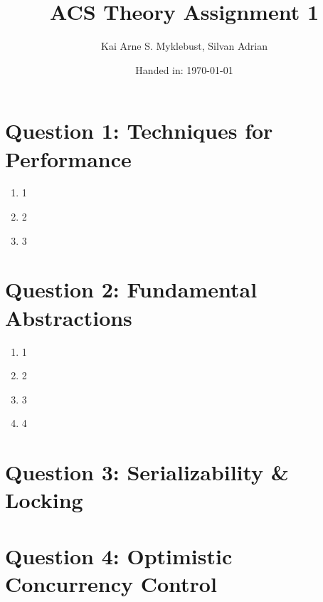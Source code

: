 \documentclass[12pt,a4paper]{article}
\begin{document}
\title{ACS Theory Assignment 1}
\subtitle{}

\author{Kai Arne S. Myklebust, Silvan Adrian}
\date{Handed in: \today}
	
\maketitle
\tableofcontents

\section{Question 1: Techniques for Performance}
\begin{enumerate}
	\item 1
	\item 2
	\item 3
\end{enumerate}

\section{Question 2: Fundamental Abstractions}
\begin{enumerate}
	\item 1
	\item 2
	\item 3
	\item 4
\end{enumerate}

\section{Question 3: Serializability \& Locking}

\section{Question 4: Optimistic Concurrency Control}
\end{document}
